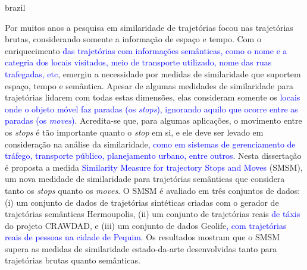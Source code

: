 \swapcontents
{
    \begin{otherlanguage*}{brazil}
    \begin{resumo}[Resumo]

        Por muitos anos a pesquisa em similaridade de trajetórias focou nas trajetórias brutas, considerando somente a informação de espaço e tempo. Com o enriquecimento \textcolor{blue}{das trajetórias com informações semânticas, como o nome e a categria dos locais visitados, meio de transporte utilizado, nome das ruas trafegadas, etc}, emergiu a necessidade por medidas de similaridade que suportem espaço, tempo e semântica. Apesar de algumas medidades de similaridade para trajetórias lidarem com todas estas dimensões, elas consideram somente os \textcolor{blue}{locais onde o objeto móvel faz paradas (os \emph{stops}), ignorando aquilo que ocorre entre as paradas (os \emph{moves})}.
        Acredita-se que, para algumas aplicações, o movimento entre os \emph{stops} é tão importante quanto o \emph{stop} em si, e ele deve ser levado em consideração na análise da similaridade\textcolor{blue}{, como em sistemas de gerenciamento de tráfego, transporte público, planejamento urbano, entre outros.}
        Nesta dissertação é proposta a medida \textcolor{blue}{Similarity Measure for trajectory Stops and Moves} (SMSM), um nova medidade de similaridade para trajetórias semânticas que considera tanto os \emph{stops} quanto os \emph{moves}.
        O SMSM é avaliado em três conjuntos de dados: (i) um conjunto de dados de trajetórias sintéticas criadas com o gerador de trajetórias semânticas Hermoupolis, (ii) um conjunto de trajetórias reais \textcolor{blue}{de táxis} do projeto CRAWDAD, e (iii) um conjunto de dados Geolife\textcolor{blue}{, com trajetórias reais de pessoas na cidade de Pequim}. Os resultados mostram que o SMSM supera as medidas de similaridade estado-da-arte desenvolvidas tanto para trajetórias brutas quanto semânticas.
        

    \end{resumo}
    \end{otherlanguage*}
}
